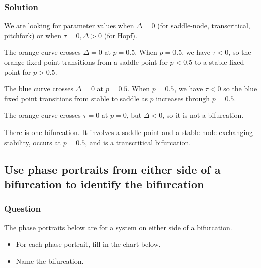 \documentclass[12pt,letterpaper,noanswers]{exam}
\begin{document}
\subsubsection{Solution}
We are looking for parameter values when $\Delta = 0$ (for saddle-node, transcritical, pitchfork) or when $\tau = 0, \Delta>0$ (for Hopf).

The orange curve crosses $\Delta = 0$ at $p=0.5$.  When $p=0.5$, we have $\tau < 0$, so the orange fixed point transitions from a saddle point for $p<0.5$ to a stable fixed point for $p>0.5$.

The blue curve crosses $\Delta = 0$ at $p = 0.5$.  When $p=0.5$, we have $\tau<0$ so the blue fixed point transitions from stable to saddle as $p$ increases through $p=0.5$.

The orange curve crosses $\tau = 0$ at $p=0$, but $\Delta<0$, so it is not a bifurcation.

There is one bifurcation.  It involves a saddle point and a stable node exchanging stability, occurs at $p=0.5$, and is a transcritical bifurcation.



\subsection{Use phase portraits from either side of a bifurcation to identify the bifurcation}
\subsubsection{Question}
The phase portraits below are for a system on either side of a bifurcation.
\begin{itemize}
    \item For each phase portrait, fill in the chart below.
        \item Name the bifurcation.
\end{itemize}
\end{document}
